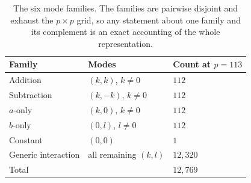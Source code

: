\begin{table}[t]
\centering\small
\caption{The six mode families. The families are pairwise disjoint and exhaust the
$p \times p$ grid, so any statement about one family and its complement is an exact
accounting of the whole representation.}
\label{tab:families}
\begin{tabular}{lll}
\toprule
Family & Modes & Count at $p = 113$ \\
\midrule
Addition & $(k, k)$, $k \neq 0$ & $112$ \\
Subtraction & $(k, -k)$, $k \neq 0$ & $112$ \\
$a$-only & $(k, 0)$, $k \neq 0$ & $112$ \\
$b$-only & $(0, l)$, $l \neq 0$ & $112$ \\
Constant & $(0, 0)$ & $1$ \\
Generic interaction & all remaining $(k, l)$ & $12{,}320$ \\
\midrule
Total & & $12{,}769$ \\
\bottomrule
\end{tabular}
\end{table}

